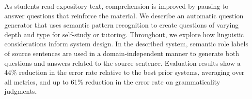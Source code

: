As students read expository text, comprehension is improved by pausing to answer questions that reinforce the material. We describe an automatic question generator that uses semantic pattern recognition to create questions of varying depth and type for self-study or tutoring. Throughout, we explore how linguistic considerations inform system design. In the described system, semantic role labels of source sentences are used in a domain-independent manner to generate both questions and answers related to the source sentence. Evaluation results show a 44\% reduction in the error rate relative to the best prior systems, averaging over all metrics, and up to 61\% reduction in the error rate on grammaticality judgments.
